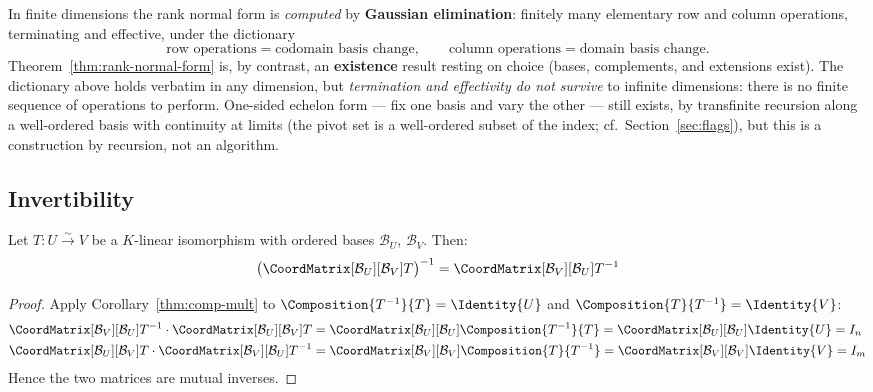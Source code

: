 \begin{remark}
\label{rem:gaussian-infinite}
    In finite dimensions the rank normal form is \emph{computed} by \textbf{Gaussian
    elimination}: finitely many elementary row and column operations, terminating and effective,
    under the dictionary
    \[
        \text{row operations} = \text{codomain basis change}, \qquad
        \text{column operations} = \text{domain basis change}.
    \]
    Theorem~\ref{thm:rank-normal-form} is, by contrast, an \textbf{existence} result resting on
    choice (bases, complements, and extensions exist). The dictionary above holds verbatim in any
    dimension, but \emph{termination and effectivity do not survive} to infinite dimensions:
    there is no finite sequence of operations to perform. One-sided echelon form --- fix one
    basis and vary the other --- still exists, by transfinite recursion along a well-ordered basis
    with continuity at limits (the pivot set is a well-ordered subset of the index;
    cf.\ Section~\ref{sec:flags}), but this is a construction by recursion, not an algorithm.
\end{remark}

\subsection{Invertibility}

\begin{theorem}
\label{thm:mat-inverse}
    Let $T: U \xrightarrow{\sim} V$ be a $K$-linear isomorphism with ordered bases
    $\mathcal{B}_U$, $\mathcal{B}_V$. Then:
    \[
        \bigl(\CoordMatrix[\mathcal{B}_U][\mathcal{B}_V]{T}\bigr)^{-1}
        = \CoordMatrix[\mathcal{B}_V][\mathcal{B}_U]{T^{-1}}
    \]
\end{theorem}

\begin{proof}
    Apply Corollary~\ref{thm:comp-mult} to
    $\Composition{T^{-1}}{T} = \Identity{U}$ and
    $\Composition{T}{T^{-1}} = \Identity{V}$:
    \begin{align*}
        \CoordMatrix[\mathcal{B}_V][\mathcal{B}_U]{T^{-1}}
        \cdot \CoordMatrix[\mathcal{B}_U][\mathcal{B}_V]{T}
        &= \CoordMatrix[\mathcal{B}_U][\mathcal{B}_U]{\Composition{T^{-1}}{T}}
         = \CoordMatrix[\mathcal{B}_U][\mathcal{B}_U]{\Identity{U}}
         = I_n \\
        \CoordMatrix[\mathcal{B}_U][\mathcal{B}_V]{T}
        \cdot \CoordMatrix[\mathcal{B}_V][\mathcal{B}_U]{T^{-1}}
        &= \CoordMatrix[\mathcal{B}_V][\mathcal{B}_V]{\Composition{T}{T^{-1}}}
         = \CoordMatrix[\mathcal{B}_V][\mathcal{B}_V]{\Identity{V}}
         = I_m
    \end{align*}
    Hence the two matrices are mutual inverses. \qedhere
\end{proof}

